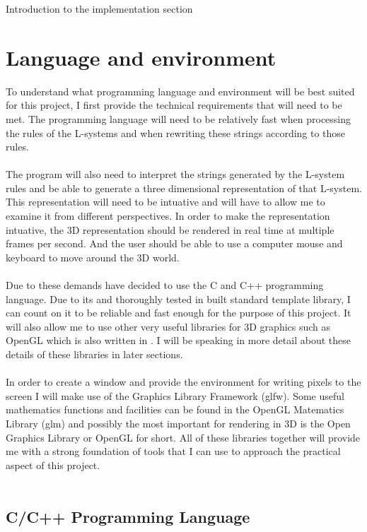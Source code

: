 Introduction to the implementation section

\section{Language and environment}

To understand what programming language and environment will be best suited for this project, I first  provide the technical requirements that will need to be met. The programming language will need to be  relatively fast when processing the rules of the L-systems and when rewriting these strings according to those rules. \\
\\
The program will also need to interpret the strings generated by the L-system rules and be able to generate a three dimensional representation of that L-system. This representation will need to be intuative and will have to allow me to examine it from different perspectives. In order to make the representation intuative, the 3D representation should be rendered in real time at multiple frames per second. And the user should be able to use a computer mouse and keyboard to move around the 3D world. \\ 
\\
Due to these demands have decided to use the C and C++ programming language. Due to its and thoroughly tested in built standard template library, I can count on it to be reliable and fast enough for the purpose of this project. It will also allow me to use other very useful libraries for 3D graphics such as \gls{OpenGL} which is also written in . I will be speaking in more detail about these details of these libraries in later sections. \\
\\
In order to create a window and provide the environment for writing pixels to the screen I will make use of the Graphics Library Framework (\acrshort{glfw}). Some useful mathematics functions and facilities can be found in the \gls{OpenGL} Matematics Library (\acrshort{glm}) and possibly the most important for rendering in 3D is the Open Graphics Library or \gls{OpenGL} for short. All of these libraries together will provide me with a strong foundation of tools that I can use to approach the practical aspect of this project. \\
\\
 

\subsection{C/C++ Programming Language}

